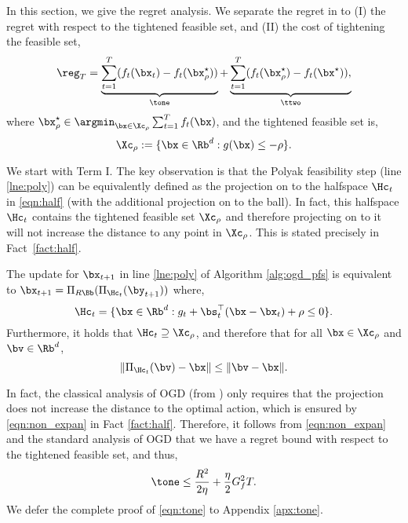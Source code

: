 In this section, we give the regret analysis.
We separate the regret in to (I) the regret with respect to the tightened feasible set, and (II) the cost of tightening the feasible set,
\begin{equation}
    \label{eqn:reg_decomp}
        \reg_T = \underbrace{\sum_{t=1}^{T} (f_t(\bx_t) - f_t(\bx_\rho^\star))}_{\tone} + \underbrace{\sum_{t=1}^{T} (f_t(\bx_\rho^\star) - f_t(\bx^\star)),}_{\ttwo}
\end{equation}
where $\bx_\rho^\star \in \argmin_{\bx \in \Xc_\rho} \sum_{t=1}^{T} f_t(\bx)$, and the tightened feasible set is,
\begin{equation}
    \label{eqn:tight}
    \Xc_\rho := \{ \bx \in \Rb^d : g(\bx) \leq -\rho \}.
\end{equation}

We start with Term I.
The key observation is that the Polyak feasibility step (line \ref{lne:poly}) can be equivalently defined as the projection on to the halfspace $\Hc_t$ in \eqref{eqn:half} (with the additional projection on to the ball).
In fact, this halfspace $\Hc_t$ contains the tightened feasible set $\Xc_\rho$ and therefore projecting on to it will not increase the distance to any point in $\Xc_\rho$.
This is stated precisely in Fact~\ref{fact:half}.

\begin{fact}
    \label{fact:half}
    The update for $\bx_{t+1}$ in line \ref{lne:poly} of Algorithm \ref{alg:ogd_pfs} is equivalent to $\bx_{t+1} = \Pi_{R \Bb} (\Pi_{\Hc_t} (\by_{t+1}))$ where,
    \begin{equation}
        \label{eqn:half}
        \Hc_t = \{ \bx \in \Rb^d : g_t + \bs_t^\top(\bx - \bx_t) + \rho \leq 0 \}.
    \end{equation}
    Furthermore, it holds that $\Hc_t \supseteq \Xc_\rho$, and therefore that for all $\bx \in \Xc_\rho$ and $\bv \in \Rb^d$,
    \begin{equation}
        \label{eqn:non_expan}
        \| \Pi_{\Hc_t} (\bv) - \bx \| \leq \| \bv - \bx \|.
    \end{equation}
\end{fact}

In fact, the classical analysis of OGD (from \citet{zinkevich2003online}) only requires that the projection does not increase the distance to the optimal action, which is ensured by \eqref{eqn:non_expan} in Fact \ref{fact:half}.
Therefore, it follows from \eqref{eqn:non_expan} and the standard analysis of OGD that we have a regret bound with respect to the tightened feasible set, and thus,
\begin{equation}
    \label{eqn:tone}
    \tone \leq \frac{R^2}{2 \eta} + \frac{\eta}{2} G_f^2 T.
\end{equation}
We defer the complete proof of \eqref{eqn:tone} to Appendix \ref{apx:tone}.

